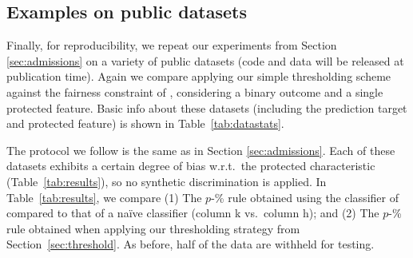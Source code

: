 

\subsection{Examples on public datasets}


Finally, for reproducibility,
we repeat our experiments from Section \ref{sec:admissions}
on a variety of public datasets (code and data will be released at publication time).
Again we compare applying our simple thresholding scheme against the fairness constraint of \cite{zafar2017fairness}, considering a binary outcome 
and a single protected feature. 
Basic info about these datasets 
(including the prediction target and protected feature) 
is shown in Table~\ref{tab:datastats}.


The protocol we follow is the same as in Section \ref{sec:admissions}. 
Each of these datasets exhibits a certain degree of bias 
w.r.t.~the protected characteristic (Table~\ref{tab:results}), 
so no synthetic discrimination is applied. 
In Table~\ref{tab:results},
we compare (1) The $p$-\% rule obtained 
using the classifier of \cite{zafar2017fairness} 
compared to that of a na\"ive classifier 
(column k vs.~column h); and 
(2) The $p$-\% rule obtained 
when applying our thresholding strategy 
from Section~\ref{sec:threshold}.
As before, half of the data are withheld for testing.

